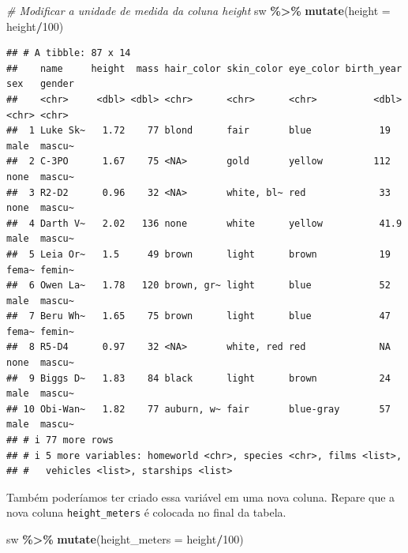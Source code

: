 \documentclass[
]{book}
\newenvironment{Shaded}{\begin{snugshade}}{\end{snugshade}}
\newcommand{\AttributeTok}[1]{\textcolor[rgb]{0.13,0.29,0.53}{#1}}
\newcommand{\CommentTok}[1]{\textcolor[rgb]{0.56,0.35,0.01}{\textit{#1}}}
\newcommand{\DecValTok}[1]{\textcolor[rgb]{0.00,0.00,0.81}{#1}}
\newcommand{\FunctionTok}[1]{\textcolor[rgb]{0.13,0.29,0.53}{\textbf{#1}}}
\newcommand{\NormalTok}[1]{#1}
\newcommand{\SpecialCharTok}[1]{\textcolor[rgb]{0.81,0.36,0.00}{\textbf{#1}}}
\begin{document}
\begin{Shaded}
\begin{Highlighting}[]
\CommentTok{\# Modificar a unidade de medida da coluna height}
\NormalTok{sw }\SpecialCharTok{\%\textgreater{}\%} \FunctionTok{mutate}\NormalTok{(}\AttributeTok{height =}\NormalTok{ height}\SpecialCharTok{/}\DecValTok{100}\NormalTok{)}
\end{Highlighting}
\end{Shaded}

\begin{verbatim}
## # A tibble: 87 x 14
##    name     height  mass hair_color skin_color eye_color birth_year sex   gender
##    <chr>     <dbl> <dbl> <chr>      <chr>      <chr>          <dbl> <chr> <chr> 
##  1 Luke Sk~   1.72    77 blond      fair       blue            19   male  mascu~
##  2 C-3PO      1.67    75 <NA>       gold       yellow         112   none  mascu~
##  3 R2-D2      0.96    32 <NA>       white, bl~ red             33   none  mascu~
##  4 Darth V~   2.02   136 none       white      yellow          41.9 male  mascu~
##  5 Leia Or~   1.5     49 brown      light      brown           19   fema~ femin~
##  6 Owen La~   1.78   120 brown, gr~ light      blue            52   male  mascu~
##  7 Beru Wh~   1.65    75 brown      light      blue            47   fema~ femin~
##  8 R5-D4      0.97    32 <NA>       white, red red             NA   none  mascu~
##  9 Biggs D~   1.83    84 black      light      brown           24   male  mascu~
## 10 Obi-Wan~   1.82    77 auburn, w~ fair       blue-gray       57   male  mascu~
## # i 77 more rows
## # i 5 more variables: homeworld <chr>, species <chr>, films <list>,
## #   vehicles <list>, starships <list>
\end{verbatim}

Também poderíamos ter criado essa variável em uma nova coluna. Repare
que a nova coluna \texttt{height\_meters} é colocada no final da tabela.

\begin{Shaded}
\begin{Highlighting}[]
\NormalTok{sw }\SpecialCharTok{\%\textgreater{}\%} \FunctionTok{mutate}\NormalTok{(}\AttributeTok{height\_meters =}\NormalTok{ height}\SpecialCharTok{/}\DecValTok{100}\NormalTok{)}
\end{Highlighting}
\end{Shaded}
\end{document}
